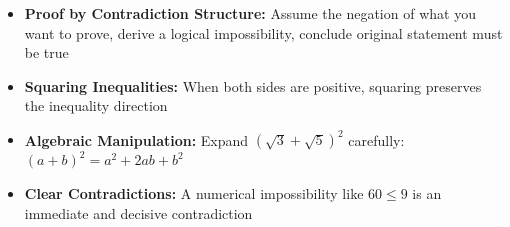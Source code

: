 \begin{takeaways}
\begin{itemize}
\item \textbf{Proof by Contradiction Structure:} Assume the negation of what you want to prove, derive a logical impossibility, conclude original statement must be true
\item \textbf{Squaring Inequalities:} When both sides are positive, squaring preserves the inequality direction
\item \textbf{Algebraic Manipulation:} Expand $(\sqrt{3}+\sqrt{5})^2$ carefully: $(a+b)^2 = a^2 + 2ab + b^2$
\item \textbf{Clear Contradictions:} A numerical impossibility like $60 \leq 9$ is an immediate and decisive contradiction
\end{itemize}
\end{takeaways}
